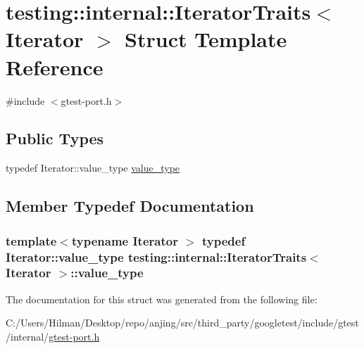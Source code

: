 \hypertarget{structtesting_1_1internal_1_1_iterator_traits}{}\section{testing\+:\+:internal\+:\+:Iterator\+Traits$<$ Iterator $>$ Struct Template Reference}
\label{structtesting_1_1internal_1_1_iterator_traits}


{\ttfamily \#include $<$gtest-\/port.\+h$>$}

\subsection*{Public Types}
\begin{DoxyCompactItemize}
\item 
typedef Iterator\+::value\+\_\+type \hyperlink{structtesting_1_1internal_1_1_iterator_traits_a29de4320a9c53ce438d3561b94e515bb}{value\+\_\+type}
\end{DoxyCompactItemize}


\subsection{Member Typedef Documentation}
\hypertarget{structtesting_1_1internal_1_1_iterator_traits_a29de4320a9c53ce438d3561b94e515bb}{}
\subsubsection[{value\+\_\+type}]{\setlength{\rightskip}{0pt plus 5cm}template$<$typename Iterator $>$ typedef Iterator\+::value\+\_\+type {\bf testing\+::internal\+::\+Iterator\+Traits}$<$ Iterator $>$\+::{\bf value\+\_\+type}}\label{structtesting_1_1internal_1_1_iterator_traits_a29de4320a9c53ce438d3561b94e515bb}


The documentation for this struct was generated from the following file\+:\begin{DoxyCompactItemize}
\item 
C\+:/\+Users/\+Hilman/\+Desktop/repo/anjing/src/third\+\_\+party/googletest/include/gtest/internal/\hyperlink{gtest-port_8h}{gtest-\/port.\+h}\end{DoxyCompactItemize}
